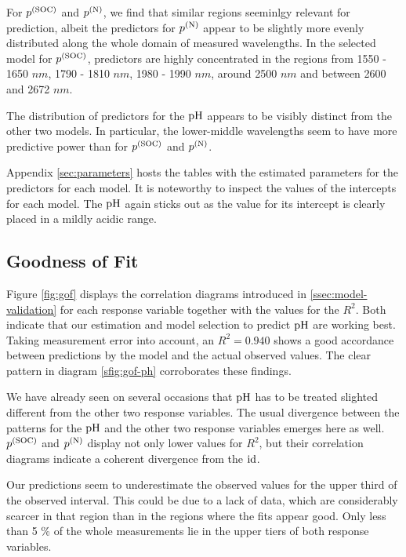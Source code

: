 		For $p^{(\mathrm{SOC})}$ and $p^{(\mathrm{N})}$, we find that similar regions seeminlgy relevant for prediction, albeit the predictors for $p^{(\mathrm{N})}$ appear to be slightly more evenly distributed along the whole domain of measured wavelengths. %
		In the selected model for $p^{(\mathrm{SOC})}$, predictors are highly concentrated in the regions from 1550 - 1650 $\unit{nm}$, 1790 - 1810 $\unit{nm}$, 1980 - 1990 $\unit{nm}$, around 2500 $\unit{nm}$ and between 2600 and 2672 $\unit{nm}$.
		
		The distribution of predictors for the $\mathrm{pH}$ appears to be visibly distinct from the other two models.
		In particular, the lower-middle wavelengths seem to have more predictive power than for $p^{(\mathrm{SOC})}$ and $p^{(\mathrm{N})}$.
		
		Appendix \ref{sec:parameters} hosts the tables with the estimated parameters for the predictors for each model.
		It is noteworthy to inspect the values of the intercepts for each model.
		The $\mathrm{pH}$ again sticks out as the value for its intercept is clearly placed in a mildly acidic range. %

				

	\subsection{Goodness of Fit}
	\label{ssec:suitability}
	
		Figure \ref{fig:gof} displays the correlation diagrams introduced in \ref{ssec:model-validation} for each response variable together with the values for the $R^2$.
		Both indicate that our estimation and model selection to predict $\mathrm{pH}$ are working best.
		Taking measurement error into account, an $R^2 = 0.940$ shows a good accordance between predictions by the model and the actual observed values.
		The clear pattern in diagram \ref{sfig:gof-ph} corroborates these findings.
		
		We have already seen on several occasions that $\mathrm{pH}$ has to be treated slighted different from the other two response variables.
		The usual divergence between the patterns for the $\mathrm{pH}$ and the other two response variables emerges here as well.
		$p^{\mathrm{(SOC)}}$ and $p^{\mathrm{(N)}}$ display not only lower values for $R^2$, but their correlation diagrams indicate a coherent divergence from the $\operatorname{id}$.
		
		Our predictions seem to underestimate the observed values for the upper third of the observed interval.
		This could be due to a lack of data, which are considerably scarcer in that region than in the regions where the fits appear good.
		Only less than 5 \% of the whole measurements lie in the upper tiers of both response variables.
		
